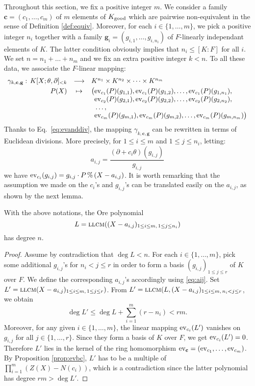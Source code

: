 \documentclass[a4paper]{llncs}
\newcommand{\ev}[1]{\textrm{\rm ev}_{#1}}
\renewcommand{\mod}{\,\%\,}
\newcommand{\llcm}{\textsc{llcm}}
\newcommand{\bc}{\textbf{c}}
\newcommand{\bg}{\textbf{g}}
\newcommand{\good}{\textrm{\rm good}}
\begin{document}
Throughout this section, we fix a positive integer $m$. We consider a 
family $\bc = (c_1, \ldots, c_m)$ of $m$ elements of $K_\good$ which are 
pairwise non-equivalent in the sense of Definition \ref{def:equiv}.
Moreover, for each $i \in \{1,\ldots,m\}$, we pick a positive integer
$n_i$ together with a family $\bg_i = (g_{i,1}, \ldots, g_{i,n_i})$ of 
$F$-linearly independant elements of $K$. The latter condition obviously
implies that $n_i \leq [K:F]$ for all $i$.
We set $n = n_1 + \ldots + n_m$ and we fix an extra positive integer
$k < n$.
To all these data, we associate the $F$-linear mapping:
$$\begin{array}{rcl}
\gamma_{k,\bc,\bg} : \, K[X;\theta,\partial]_{<k} & \longrightarrow 
 & K^{n_1} \times K^{n_2} \times \cdots \times K^{n_m} \smallskip \\
P(X) & \mapsto 
 & \big(\ev{c_1}(P)(g_{1,1}), \ev{c_1}(P)(g_{1,2}), \ldots, \ev{c_1}(P)(g_{1,n_1}), \\
&& \phantom{\big(}\ev{c_2}(P)(g_{2,1}), \ev{c_2}(P)(g_{2,2}), \ldots, \ev{c_2}(P)(g_{2,n_2}), \\
&& \phantom{\big(}\ldots, \\
&& \phantom{\big(}\ev{c_m}(P)(g_{m,1}), \ev{c_m}(P)(g_{m,2}), \ldots, \ev{c_m}(P)(g_{m,n_m})\big)
\end{array}$$
Thanks to Eq.~\eqref{eq:evanddiv}, the mapping $\gamma_{k,\bc,\bg}$
can be rewritten in terms of Euclidean divisions. More precisely,
for $1 \leq i \leq m$ and $1 \leq j \leq n_i$, letting:
\begin{equation}
\label{eq:aij}
a_{i,j} = \frac{(\partial + c_i\theta)(g_{i,j})}{g_{i,j}}
\end{equation}
we have $\ev{c_i}(g_{i,j}) = g_{i,j} \cdot P \mod (X - a_{i,j})$.
It is worth remarking that the assumption we made on the $c_i$'s
and $g_{i,j}$'s can be translated easily on the $a_{i,j}$, as shown
by the next lemma.

\begin{lemma}
\label{lem:llcmaij}
With the above notations, the Ore polynomial
$$L = \llcm((X - a_{i,j})_{1 \leq i \leq m,\,1 \leq j \leq n_i})$$
has degree $n$.
\end{lemma}

\begin{proof}
Assume by contradiction that $\deg L < n$.
For each $i \in \{1,\ldots,m\}$, pick some additional $g_{i,j}$'s
for $n_i < j \leq r$ in order to form a basis $(g_{i,j})_{1 \leq j 
\leq r}$ of $K$ over $F$. We define the corresponding $a_{i,j}$'s
accordingly using \eqref{eq:aij}. 
Set $L' = \llcm(X - a_{i,j})_{1 \leq i \leq m,\,1 \leq j \leq r})$.
From
$L' = \llcm(L, (X - a_{i,j})_{1 \leq i \leq m,\,n_i < j \leq r}$,
we obtain 
$$\deg L' \leq \deg L + \sum_{i=1}^m (r - n_i) < rm.$$
Moreover, for any given $i \in \{1,\ldots, m\}$, the linear mapping 
$\ev{c_i}(L')$ vanishes on $g_{i,j}$ for all $j \in \{1, \ldots,r\}$. 
Since they form a basis of $K$ over $F$, we get $\ev{c_i}(L') = 0$.
Therefore $L'$ lies in the kernel of the ring homomorphism $\ev\bc =
(\ev{c_1}, \ldots, \ev{c_m})$. By Proposition \ref{prop:evbc},
$L'$ has to be a multiple of $\prod_{i=1}^m (Z(X) - N(c_i))$,
which is a contradiction since the latter polynomial has degree $rm > 
\deg L'$.
\end{proof}
\end{document}
